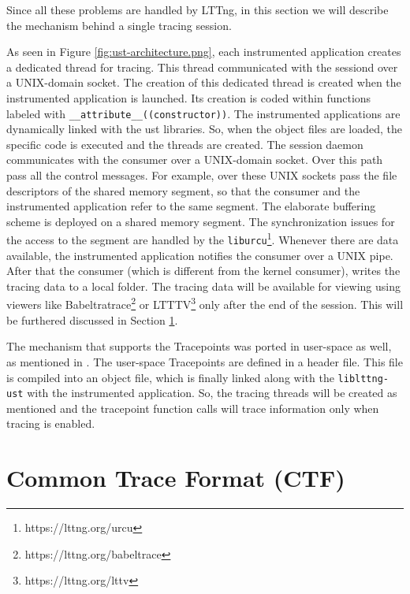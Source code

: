 Since all these problems are handled by LTTng, in this section we will describe
the mechanism behind a single tracing session.


As seen in Figure \ref{fig:ust-architecture.png}, each instrumented application
creates a dedicated thread for tracing. This thread communicated with the
sessiond over a UNIX-domain socket. The creation of this dedicated thread is
created when the instrumented application is launched. Its creation is coded
within functions labeled with \texttt{\_\_attribute\_\_((constructor))}. The
instrumented applications are dynamically linked with the ust libraries. So,
when the object files are loaded, the specific code is executed and the threads
are created. The session daemon communicates with the consumer over a
UNIX-domain socket. Over this path pass all the control messages. For example,
over these UNIX sockets pass the file descriptors of the shared memory segment,
so that the consumer and the instrumented application refer to the same segment.
The elaborate buffering scheme is deployed on a shared memory segment. The
synchronization issues for the access to the segment are handled by the
\texttt{liburcu}\footnote{https://lttng.org/urcu}. Whenever there are data
available, the instrumented application notifies the consumer over a UNIX pipe.
After that the consumer (which is different from the kernel consumer), writes
the tracing data to a local folder. The tracing data will be available for
viewing using viewers like Babeltratrace\footnote{https://lttng.org/babeltrace}
or LTTTV\footnote{https://lttng.org/lttv} only after the end of the session.
This will be furthered discussed in Section \ref{sec:ctf}.

The mechanism that supports the Tracepoints was ported in user-space as well, as
mentioned in \cite{userspace-markers}. The user-space Tracepoints are defined in
a header file. This file is compiled into an object file, which is finally
linked along with the \texttt{liblttng-ust} with the instrumented application.
So, the tracing threads will be created as mentioned and the tracepoint function
calls will trace information only when tracing is enabled.

\section{Common Trace Format (CTF)}\label{sec:ctf}

